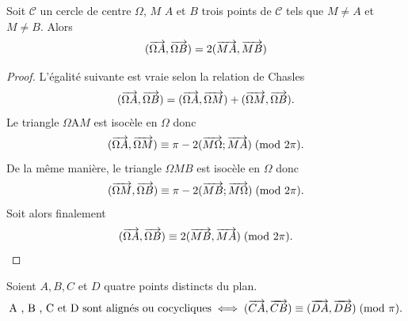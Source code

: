 \begin{prop}
  \label{prop:cocy}
  Soit \(\mathcal{C}\) un cercle de centre \(\Omega\), \(M\) \(A\) et \(B\) 
  trois points de \(\mathcal{C}\) tels que \(M \neq A\) et \(M \neq B\). Alors 
  \begin{equation}
    (\overrightarrow{\Omega A},\overrightarrow{\Omega B}) = 2 (\overrightarrow{MA},\overrightarrow{MB})
  \end{equation}
\end{prop}

\begin{proof}
  L'égalité suivante est vraie selon la relation de Chasles
  \begin{equation}
    (\overrightarrow{\Omega A},\overrightarrow{\Omega B}) = (\overrightarrow{\Omega A},\overrightarrow{\Omega M}) + 
    (\overrightarrow{\Omega M},\overrightarrow{\Omega B}).
  \end{equation}
  Le triangle \(\Omega \)A\( M\) est isocèle en \(\Omega\) donc
  \begin{equation}
    (\overrightarrow{\Omega A}, \overrightarrow{\Omega M}) \equiv \pi - 2 (\overrightarrow{M\Omega}; 
    \overrightarrow{MA})\!\pmod {2\pi}.
  \end{equation}
  De la même manière, le triangle \(\Omega M B\) est isocèle en \(\Omega\) 
  donc
  \begin{equation}
    (\overrightarrow{\Omega M}, \overrightarrow{\Omega B}) \equiv \pi - 2 (\overrightarrow{MB}; 
    \overrightarrow{M\Omega})\!\pmod {2\pi}.
  \end{equation}
  Soit alors finalement \begin{equation}
    (\overrightarrow{\Omega A}, \overrightarrow{\Omega B}) \equiv 2 (\overrightarrow{MB}, 
    \overrightarrow{MA})\!\pmod {2\pi}.
  \end{equation}
\end{proof}

\begin{theo}
  Soient \(A , B , C\) et \(D\) quatre points distincts du plan.
  \begin{equation}
    \text{A , B , C et D sont alignés ou cocycliques} \iff (\overrightarrow{CA}, 
    \overrightarrow{CB}) \equiv (\overrightarrow{DA}, \overrightarrow{DB})\!\pmod {\pi}.
  \end{equation}
\end{theo}

